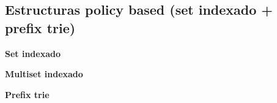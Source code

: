 \subsection{Estructuras policy based (set indexado + prefix trie)}
    \textbf{Set indexado}
    

    \textbf{Multiset indexado}
    

    \textbf{Prefix trie}
    